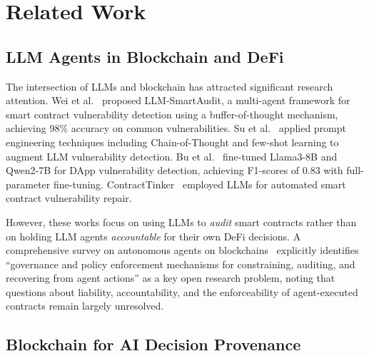 \documentclass[manuscript,nonacm]{acmart}
\begin{document}
\section{Related Work}
\label{sec:related}

\subsection{LLM Agents in Blockchain and DeFi}

The intersection of LLMs and blockchain has attracted significant research attention.
Wei et al.~\cite{llm_smartaudit} proposed LLM-SmartAudit, a multi-agent framework for smart contract vulnerability detection using a buffer-of-thought mechanism, achieving 98\% accuracy on common vulnerabilities.
Su et al.~\cite{su2026detection} applied prompt engineering techniques including Chain-of-Thought and few-shot learning to augment LLM vulnerability detection.
Bu et al.~\cite{bu2026dapp} fine-tuned Llama3-8B and Qwen2-7B for DApp vulnerability detection, achieving F1-scores of 0.83 with full-parameter fine-tuning.
ContractTinker~\cite{contracttinker2024} employed LLMs for automated smart contract vulnerability repair.

However, these works focus on using LLMs to \emph{audit} smart contracts rather than on holding LLM agents \emph{accountable} for their own DeFi decisions.
A comprehensive survey on autonomous agents on blockchains~\cite{autonomous_agents_blockchain} explicitly identifies ``governance and policy enforcement mechanisms for constraining, auditing, and recovering from agent actions'' as a key open research problem, noting that questions about liability, accountability, and the enforceability of agent-executed contracts remain largely unresolved.

\subsection{Blockchain for AI Decision Provenance}
\end{document}
